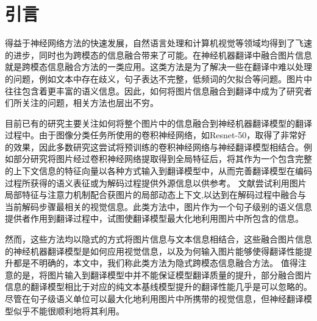 \section{引言}
得益于神经网络方法的快速发展，自然语言处理和计算机视觉等领域均得到了飞速的进步，同时也为跨模态的信息融合带来了可能。在神经机器翻译中融合图片信息就是跨模态信息融合方法的一类应用。这类方法是为了解决一些在翻译中难以处理的问题，例如文本中存在歧义，句子表达不完整，低频词的欠拟合等问题。图片中往往包含着更丰富的语义信息。因此，如何将图片信息融合到翻译中成为了研究者们所关注的问题，相关方法也层出不穷。

目前已有的研究主要关注如何将整个图片中的信息融合到神经机器翻译模型的翻译过程中。由于图像分类任务所使用的卷积神经网络，如Resnet-50\cite{32_DBLP:conf/cvpr/HeZRS16}，取得了非常好的效果，因此多数研究这尝试将预训练的卷积神经网络与神经翻译模型相结合。例如部分研究将图片经过卷积神经网络提取得到全局特征后，将其作为一个包含完整的上下文信息的特征向量以各种方式输入到翻译模型中，从而完善翻译模型在编码过程所获得的语义表征或为解码过程提供外源信息以供参考\cite{52_DBLP:journals/corr/ElliottFH15,18_DBLP:conf/emnlp/CalixtoL17,22_li-etal-2021-vision,20_wu-etal-2021-good}。
文献\cite{36_calixto-etal-2017-doubly,47_DBLP:conf/wmt/LibovickyHM18}尝试利用图片局部特征与注意力机制配合获图片的局部动态上下文,以达到在解码过程中融合与当前解码步骤最相关的视觉信息。此类方法中，图片作为一个句子级别的语义信息提供者作用到翻译过程中，试图使翻译模型最大化地利用图片中所包含的信息。

然而，这些方法均以隐式的方式将图片信息与文本信息相结合，这些融合图片信息的神经机器翻译模型是如何应用视觉信息，以及为何输入图片能够使得翻译性能提升都是不明确的，本文中，我们称此类方法为隐式跨模态信息融合方法。
值得注意的是，将图片输入到翻译模型中并不能保证模型翻译质量的提升，部分融合图片信息的翻译模型相比于对应的纯文本基线模型提升的翻译性能几乎是可以忽略的\cite{53_caglayan-etal-2019-probing}。
尽管在句子级语义单位可以最大化地利用图片中所携带的视觉信息，但神经翻译模型似乎不能很顺利地将其利用。

